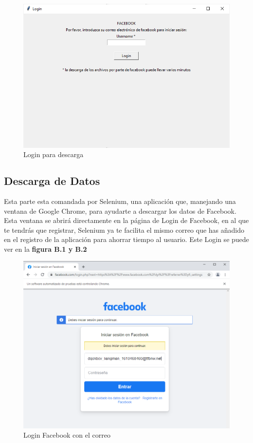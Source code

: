 \begin{figure}
	\begin{center}
		\includegraphics[scale=0.7]{Imagenes/Fuentes/PantallaLogin.png} 
		\caption{Login para descarga}
		\label{PantallaLogin}
	\end{center}
\end{figure}

\subsection{Descarga de Datos}

Esta parte esta comandada por Selenium, una aplicación que, manejando una ventana de Google Chrome, para ayudarte a descargar los datos de Facebook. Esta ventana se abrirá directamente en la página de Login de Facebook, en al que te tendrás que registrar, Selenium ya te facilita el mismo correo que has añadido en el registro de la aplicación para ahorrar tiempo al usuario. Este Login se puede ver en la \textbf{figura B.1 y B.2} 

\begin{figure}
	\begin{center}
		\includegraphics[scale=0.5]{Imagenes/Fuentes/TutorialDescarga1.png} \caption{Login Facebook con el correo}
		\label{TutorialDescarga1}
	\end{center}
\end{figure}


